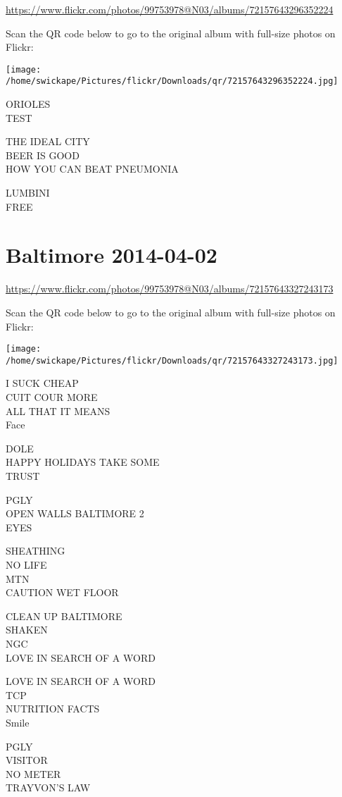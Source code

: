 \documentclass[10pt,letterpaper]{article}
\begin{document}
\url{https://www.flickr.com/photos/99753978@N03/albums/72157643296352224}

Scan the QR code below to go to the original album with full-size photos on Flickr:

\texttt{[image: /home/swickape/Pictures/flickr/Downloads/qr/72157643296352224.jpg]}
\pagebreak

ORIOLES\\
TEST

THE IDEAL CITY\\
BEER IS GOOD\\
HOW YOU CAN BEAT PNEUMONIA

LUMBINI\\
FREE
\pagebreak

\section*{Baltimore 2014-04-02}

\url{https://www.flickr.com/photos/99753978@N03/albums/72157643327243173}

Scan the QR code below to go to the original album with full-size photos on Flickr:

\texttt{[image: /home/swickape/Pictures/flickr/Downloads/qr/72157643327243173.jpg]}
\pagebreak

I SUCK CHEAP\\
CUIT COUR MORE\\
ALL THAT IT MEANS\\
Face

DOLE\\
HAPPY HOLIDAYS TAKE SOME\\
TRUST

PGLY\\
OPEN WALLS BALTIMORE 2\\
EYES

SHEATHING\\
NO LIFE\\
MTN\\
CAUTION WET FLOOR

CLEAN UP BALTIMORE\\
SHAKEN\\
NGC\\
LOVE IN SEARCH OF A WORD

LOVE IN SEARCH OF A WORD\\
TCP\\
NUTRITION FACTS\\
Smile

PGLY\\
VISITOR\\
NO METER\\
TRAYVON'S LAW
\end{document}
